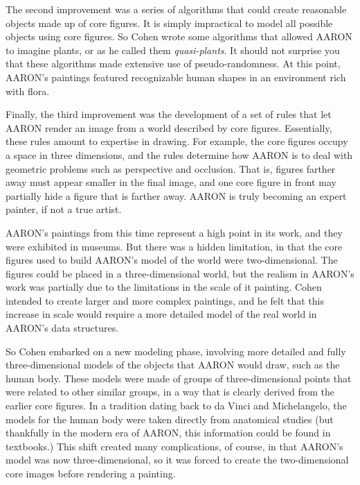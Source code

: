 The second improvement was a series of algorithms that could create reasonable
objects made up of core figures. It is simply impractical to model all possible
objects using core figures. So Cohen wrote some algorithms that allowed AARON to
imagine plants, or as he called them \emph{quasi-plants}. It should not surprise
you that these algorithms made extensive use of pseudo-randomness. At this point,
AARON's paintings featured recognizable human shapes in an environment rich with 
flora.

Finally, the third improvement was the development of a set of rules that 
let AARON render an image from a world described by core figures. Essentially,
these rules amount to expertise in drawing. For example, the core figures occupy
a space in three dimensions, and the rules determine how AARON is to deal with
geometric problems such as perspective and occlusion. That is, figures farther
away must appear smaller in the final image, and one core figure in front may
partially hide a figure that is farther away. AARON is truly becoming an expert
painter, if not a true artist.

AARON's paintings from this time represent a high point in its work, and they
were exhibited in museums. But there was a hidden limitation, in that the core figures 
used to build AARON's model of the world were two-dimensional. The figures could be 
placed in a three-dimensional world, but the realism in AARON's work was partially
due to the limitations in the scale of it painting. Cohen intended to create larger
and more complex paintings, and he felt that this increase in scale would require a
more detailed model of the real world in AARON's data structures.

So Cohen embarked on a new modeling phase, involving more detailed and fully 
three-dimensional models of the objects that AARON would draw, such as the human
body. These models were made of groups of three-dimensional points that were
related to other similar groups, in a way that is clearly derived from the earlier
core figures. In a tradition dating back to da Vinci and Michelangelo, the models
for the human body were taken directly from anatomical studies (but thankfully in 
the modern era of AARON, this information could be found in textbooks.) This shift
created many complications, of course, in that AARON's model was now three-dimensional,
so it was forced to create the two-dimensional core images before rendering a
painting. 

